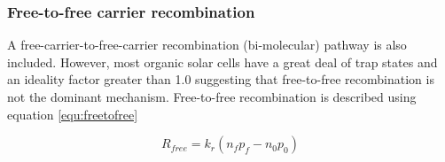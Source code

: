 
\subsubsection{Free-to-free carrier recombination}
A free-carrier-to-free-carrier recombination (bi-molecular) pathway is also included. However, most organic solar cells have a great deal of trap states and an ideality factor greater than 1.0 suggesting that free-to-free recombination is not the dominant mechanism.  Free-to-free recombination is described using equation \ref{equ:freetofree}

\begin{equation}
R_{free}=k_{r}(n_{f}p_{f}-n_{0}p_{0})
\label{equ:freetofree}
\end{equation}

